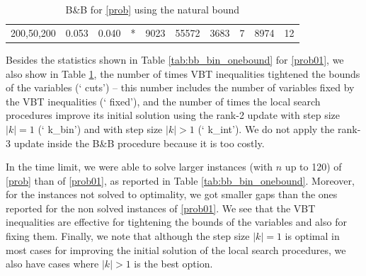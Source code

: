 \documentclass[smallextended]{svjour3hack}       %
\begin{document}
\begin{table}[!ht]
\begin{tabular}{c|r|r|r|r|r|r|r|rr}
200,50,200          & 0.053                                     & 0.040                                & *                                           & 9023                                      & 55572                                    & 3683                                      & 7                                       & 8974                                      & 12                                       
\end{tabular}
\caption{B\&B for \ref{prob} using  the natural bound}\label{tab:results_integer}
\end{table}

Besides the statistics shown in Table \ref{tab:bb_bin_onebound} for \ref{prob01}, we also show in Table \ref{tab:results_integer},  the number of  times VBT inequalities  tightened the bounds of the variables (`\raisebox{1.2pt}{{\scriptsize{$\#$}}}\! cuts') -- this number includes the number of variables fixed by the VBT inequalities (`\raisebox{1.2pt}{{\scriptsize{$\#$}}}\! fixed'), and the number of times the local search procedures improve its initial solution using the rank-2 update with step size $|k|=1$  (`\raisebox{1.2pt}{{\scriptsize{$\#$}}}\! k\_bin') and with step size $|k|>1$  (`\raisebox{1.2pt}{{\scriptsize{$\#$}}}\! k\_int'). 
We do not apply the rank-3 update inside the B\&B procedure because it is too costly.

 In the time limit, we were able to solve larger instances (with $n$ up to 120)  of \ref{prob} than of \ref{prob01}, as reported in Table \ref{tab:bb_bin_onebound}. Moreover, for the instances not solved to optimality, we got smaller gaps than the ones reported for the non solved instances of \ref{prob01}. We see that the VBT inequalities are effective for tightening the bounds of the variables and also for fixing them. Finally, we note that although the step size $|k|=1$ is optimal in most cases for improving the initial solution of the local search procedures, we also have cases where  $|k|>1$ is the best option. 
\end{document}
